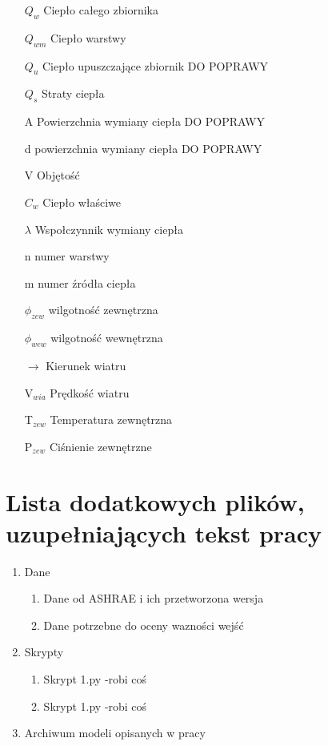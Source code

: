 \documentclass[a4paper,twoside,12pt]{book}
\begin{document}
\begin{appendices}
\begin{itemize}
    \item[$Q_w$] Ciepło całego zbiornika
    \item[$Q_{wm}$] Ciepło warstwy
    \item[$Q_u$] Ciepło upuszczające zbiornik DO POPRAWY
    \item[$Q_s$] Straty ciepła
    \item[A] Powierzchnia wymiany ciepła DO POPRAWY
    \item[d] powierzchnia wymiany ciepła DO POPRAWY
    \item[V] Objętość
    \item[$C_w$] Ciepło właściwe
    \item[$\lambda$] Wspołczynnik wymiany ciepła
    \item[n] numer warstwy
    \item[m] numer źródła ciepła
    \item[$\phi_{zew}$] wilgotność zewnętrzna
    \item[$\phi_{wew}$] wilgotność wewnętrzna
    \item[$\longrightarrow$] Kierunek wiatru
    \item[V$_{wia}$] Prędkość wiatru
    \item[T$_{zew}$] Temperatura zewnętrzna
    \item[P$_{zew}$] Ciśnienie zewnętrzne
  \end{itemize}



  \chapter{Lista dodatkowych plików, uzupełniających tekst pracy}

  \begin{enumerate}
    \item Dane
          \begin{enumerate}
            \item Dane od ASHRAE i ich przetworzona wersja
            \item Dane potrzebne do oceny wazności wejść
          \end{enumerate}
    \item Skrypty
          \begin{enumerate}
            \item Skrypt 1.py -robi coś
            \item Skrypt 1.py -robi coś
          \end{enumerate}
    \item Archiwum modeli opisanych w pracy
  \end{enumerate}



  \listoffigures
  \listoftables

\end{appendices}
\end{document}
